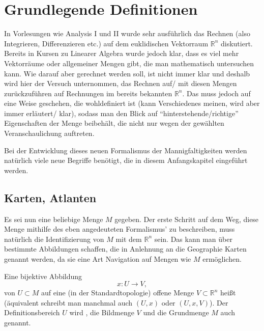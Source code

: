 \documentclass[../H_Analysis_main.tex]{subfiles}
\begin{document}
\setcounter{chapter}{1}

\chapter{Grundlegende Definitionen}
\begin{center}
In Vorlesungen wie Analysis I und II wurde sehr ausführlich das Rechnen (also Integrieren, Differenzieren etc.) auf dem euklidischen Vektorraum $\mathbb{R}^n$ diskutiert. Bereits in Kursen zu Linearer Algebra wurde jedoch klar, dass es viel mehr Vektorräume oder allgemeiner Mengen gibt, die man mathematisch untersuchen kann. Wie darauf aber gerechnet werden soll, ist nicht immer klar und deshalb wird hier der Versuch unternommen, das Rechnen auf/ mit diesen Mengen zurückzuführen auf Rechnungen im bereits bekannten $\mathbb{R}^n$. Das muss jedoch auf eine Weise geschehen, die wohldefiniert ist (kann Verschiedenes meinen, wird aber immer erläutert/ klar), sodass man den Blick auf \enquote{hinterstehende/richtige} Eigenschaften der Menge beibehält, die nicht nur wegen der gewählten Veranschaulichung auftreten.

Bei der Entwicklung dieses neuen Formalismus der Mannigfaltigkeiten werden natürlich viele neue Begriffe benötigt, die in diesem Anfangskapitel eingeführt werden.
\end{center}


\newpage


	\section{Karten, Atlanten}
Es sei nun eine beliebige Menge $M$ gegeben. Der erste Schritt auf dem Weg, diese Menge mithilfe des eben angedeuteten Formalismus' zu beschreiben, muss natürlich die Identifizierung von $M$ mit dem $\mathbb{R}^n$ sein. Das kann man über bestimmte Abbildungen schaffen, die in Anlehnung an die Geographie Karten genannt werden, da sie eine Art Navigation auf Mengen wie $M$ ermöglichen.
\begin{defi}[Karte]
Eine bijektive Abbildung
\begin{equation}
x: U \rightarrow V ,
\end{equation}
von $U \subset M$ auf eine (in der Standardtopologie) offene Menge $V \subset \mathbb{R}^n$ heißt  (äquivalent schreibt man manchmal auch $(U, x)$ oder $(U, x, V)$). Der Definitionsbereich $U$ wird , die Bildmenge $V$  und die Grundmenge $M$ auch  genannt.
\end{defi}
\end{document}
